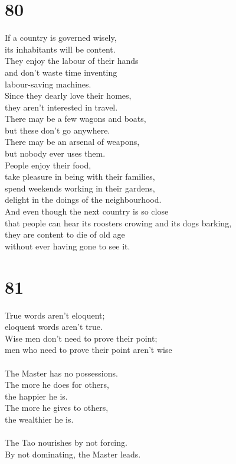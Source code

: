 \documentclass[b5paper, 12pt, oneside]{book}
\begin{document}
\chapter*{80}
If a country is governed wisely,\\
its inhabitants will be content.\\
They enjoy the labour of their hands\\
and don't waste time inventing\\
labour-saving machines.\\
Since they dearly love their homes,\\
they aren't interested in travel.\\
There may be a few wagons and boats,\\
but these don't go anywhere.\\
There may be an arsenal of weapons,\\
but nobody ever uses them.\\
People enjoy their food,\\
take pleasure in being with their families,\\
spend weekends working in their gardens,\\
delight in the doings of the neighbourhood.\\
And even though the next country is so close\\
that people can hear its roosters crowing and its dogs barking,\\
they are content to die of old age\\
without ever having gone to see it.

\chapter*{81}
True words aren't eloquent;\\
eloquent words aren't true.\\
Wise men don't need to prove their point;\\
men who need to prove their point aren't wise\\
\\
The Master has no possessions.\\
The more he does for others,\\
the happier he is.\\
The more he gives to others,\\
the wealthier he is.\\
\\
The Tao nourishes by not forcing.\\
By not dominating, the Master leads.
\end{document}
